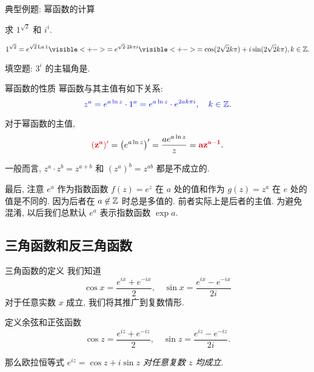 \begin{frame}{典型例题: 幂函数的计算}
	\onslide<+->
	\begin{example}
		求 $1^{\sqrt 2}$ 和 $i^i$.
	\end{example}
	\onslide<+->
	\begin{solution}
		\[
			1^{\sqrt2}=e^{\sqrt2\Ln1}
			\visible<+->{=e^{\sqrt 2\cdot 2k\pi i}}
			\visible<+->{=\cos(2\sqrt 2k\pi)+i\sin(2\sqrt 2k\pi), k\in\BZ.}\]
		\onslide<+->{%
		\[
			i^i=e^{i\Ln i}
			\visible<+->{=\exp\left[i\cdot\left(2k+\half\right)\pi i\right]}
			\visible<+->{=\exp\left(-2k\pi-\half\pi\right), k\in\BZ.}\]}
		\vspace{-\baselineskip}
	\end{solution}
	\onslide<+->
	\begin{exercise}
		填空题: $3^i$ 的主辐角是.
	\end{exercise}
\end{frame}


\begin{frame}{幂函数的性质}
	幂函数与其主值有如下关系:
	\onslide<+->
	\[\emph{z^a=e^{a\ln z}\cdot 1^a
	=e^{a\ln z}\cdot e^{2ak\pi i},\quad k\in\BZ.}\]

	\onslide<+->
	对于幂函数的主值,
	\[\alert{(z^a)'}=\left(e^{a\ln z}\right)'=\frac{ae^{a\ln z}}z=\alert{az^{a-1}}.\]

	\onslide<+->
	一般而言, $z^a\cdot z^b=z^{a+b}$ 和 $(z^a)^b=z^{ab}$ 都是不成立的.

	\onslide<+->
	最后, 注意 $e^a$ 作为指数函数 $f(z)=e^z$ 在 $a$ 处的值和作为 $g(z)=z^a$ 在 $e$ 处的值是\alert{不同}的.
	\onslide<+->
	因为后者在 $a\not\in{\mathbb{Z}}$ 时总是多值的.
	\onslide<+->
	前者实际上是后者的主值.
	\onslide<+->
	为避免混淆, 以后我们总\alert{默认 $e^a$ 表示指数函数 $\exp a$}.
\end{frame}


\subsection{三角函数和反三角函数}

\begin{frame}{三角函数的定义}
	\onslide<+->
	我们知道
	\[\cos x=\frac{e^{ix}+e^{-ix}}2,\quad
	\sin x=\frac{e^{ix}-e^{-ix}}{2i}\]
	对于任意实数 $x$ 成立,
	\onslide<+->
	我们将其推广到复数情形.
	\onslide<+->
	\begin{definition}
		定义余弦和正弦函数
		\[\displaystyle\cos z=\frac{e^{iz}+e^{-iz}}2,\quad
		\sin z=\frac{e^{iz}-e^{-iz}}{2i}.\]
	\end{definition}

	\onslide<+->
	那么欧拉恒等式 \emph{$e^{iz}=\cos z+i\sin z$ 对任意复数 $z$ 均成立}.
\end{frame}


